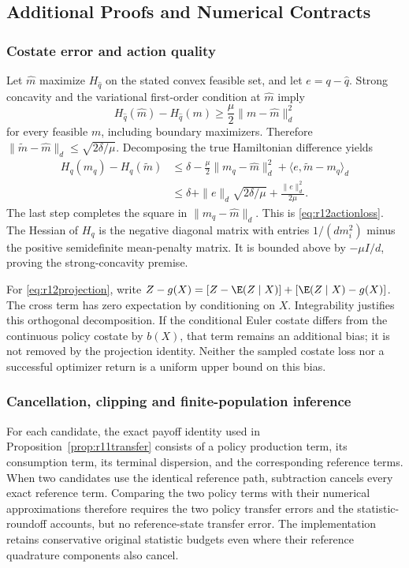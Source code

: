 \subsection{Additional Proofs and Numerical Contracts}\label{app:r12proofs}
\subsubsection{Costate error and action quality}
Let $\widehat m$ maximize $H_{\widehat q}$ on the stated convex feasible set, and let $e=q-\widehat q$. Strong concavity and the variational first-order condition at $\widehat m$ imply
\[
 H_{\widehat q}(\widehat m)-H_{\widehat q}(m)
       \geq \frac\mu2\|m-\widehat m\|_d^2
\]
for every feasible $m$, including boundary maximizers. Therefore
$\|\widetilde m-\widehat m\|_d\leq\sqrt{2\delta/\mu}$. Decomposing the true Hamiltonian difference yields
\begin{align*}
 H_q(m_q)-H_q(\widetilde m)
 &\leq \delta-\frac\mu2\|m_q-\widehat m\|_d^2
           +\langle e,\widetilde m-m_q\rangle_d\\
 &\leq \delta+\|e\|_d\sqrt{2\delta/\mu}+\frac{\|e\|_d^2}{2\mu}.
\end{align*}
The last step completes the square in $\|m_q-\widehat m\|_d$. This is \eqref{eq:r12actionloss}. The Hessian of $H_q$ is the negative diagonal matrix with entries $1/(dm_i^2)$ minus the positive semidefinite mean-penalty matrix. It is bounded above by $-\mu I/d$, proving the strong-concavity premise.

For \eqref{eq:r12projection}, write $Z-g(X)=[Z-\E(Z\mid X)]+[\E(Z\mid X)-g(X)]$. The cross term has zero expectation by conditioning on $X$. Integrability justifies this orthogonal decomposition. If the conditional Euler costate differs from the continuous policy costate by $b(X)$, that term remains an additional bias; it is not removed by the projection identity. Neither the sampled costate loss nor a successful optimizer return is a uniform upper bound on this bias.

\subsubsection{Cancellation, clipping and finite-population inference}
For each candidate, the exact payoff identity used in Proposition~\ref{prop:r11transfer} consists of a policy production term, its consumption term, its terminal dispersion, and the corresponding reference terms. When two candidates use the identical reference path, subtraction cancels every exact reference term. Comparing the two policy terms with their numerical approximations therefore requires the two policy transfer errors and the statistic-roundoff accounts, but no reference-state transfer error. The implementation retains conservative original statistic budgets even where their reference quadrature components also cancel.

